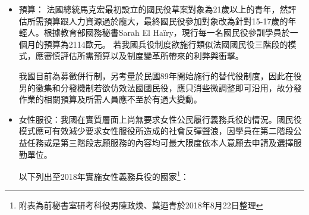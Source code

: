\documentclass[a4paper,14pt]{extarticle}
\theoremstyle{plain}
\theoremstyle{remark}
\numberwithin{equation}{section}
\begin{document}
\begin{itemize}
  \item 預算： 法國總統馬克宏最初設立的國民役草案對象為21歲以上的青年，然評估所需預算跟人力資源過於龐大，最終國民役參加對象改為針對15-17歲的年輕人。根據教育部國務秘書Sarah El Haïry，現行每一名國民役參訓學員於一個月的預算為2114歐元。
若我國兵役制度欲施行類似法國國民役三階段的模式，應審慎評估所需預算以及制度變革所帶來的利弊與衝擊。
\par
    我國目前為募徵併行制，另考量於民國89年開始施行的替代役制度，因此在役男的徵集和分發機制若欲仿效法國國民役，應只消些微調整即可沿用，故分發作業的相關預算及所需人員應不至於有過大變動。

  \item 女性服役：我國在實質層面上尚無要求女性公民履行義務兵役的情況。國民役模式應可有效減少要求女性服役所造成的社會反彈聲浪，因學員在第二階段公益任務或是第三階段志願服務的內容均可最大限度依本人意願去申請及選擇服勤單位。

以下列出至2018年實施女性義務兵役的國家\footnote{附表為前秘書室研考科役男陳政煥、葉迺青於2018年8月22日整理}：


\end{itemize}
\end{document}
